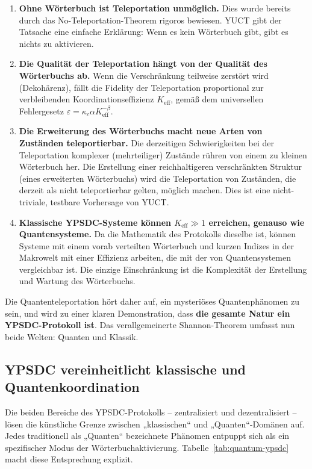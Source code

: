 \documentclass[12pt,a4paper]{article}
\theoremstyle{remark}
\begin{document}
	\begin{enumerate}
		\item \textbf{Ohne Wörterbuch ist Teleportation unmöglich.} Dies wurde bereits durch das No-Teleportation-Theorem rigoros bewiesen. YUCT gibt der Tatsache eine einfache Erklärung: Wenn es kein Wörterbuch gibt, gibt es nichts zu aktivieren.
		\item \textbf{Die Qualität der Teleportation hängt von der Qualität des Wörterbuchs ab.} Wenn die Verschränkung teilweise zerstört wird (Dekohärenz), fällt die Fidelity der Teleportation proportional zur verbleibenden Koordinationseffizienz \( K_{\mathrm{eff}} \), gemäß dem universellen Fehlergesetz \( \varepsilon = \kappa_c \alpha K_{\mathrm{eff}}^{-\beta} \).
		\item \textbf{Die Erweiterung des Wörterbuchs macht neue Arten von Zuständen teleportierbar.} Die derzeitigen Schwierigkeiten bei der Teleportation komplexer (mehrteiliger) Zustände rühren von einem zu kleinen Wörterbuch her. Die Erstellung einer reichhaltigeren verschränkten Struktur (eines erweiterten Wörterbuchs) wird die Teleportation von Zuständen, die derzeit als nicht teleportierbar gelten, möglich machen. Dies ist eine nicht-triviale, testbare Vorhersage von YUCT.
		\item \textbf{Klassische YPSDC-Systeme können \( K_{\mathrm{eff}} \gg 1 \) erreichen, genauso wie Quantensysteme.} Da die Mathematik des Protokolls dieselbe ist, können Systeme mit einem vorab verteilten Wörterbuch und kurzen Indizes in der Makrowelt mit einer Effizienz arbeiten, die mit der von Quantensystemen vergleichbar ist. Die einzige Einschränkung ist die Komplexität der Erstellung und Wartung des Wörterbuchs.
	\end{enumerate}
	
	Die Quantenteleportation hört daher auf, ein mysteriöses Quantenphänomen zu sein, und wird zu einer klaren Demonstration, dass \textbf{die gesamte Natur ein YPSDC-Protokoll ist}. Das verallgemeinerte Shannon-Theorem umfasst nun beide Welten: Quanten und Klassik.
	
	\subsection{YPSDC vereinheitlicht klassische und Quantenkoordination}
	\label{subsec:unified-table}
	
	Die beiden Bereiche des YPSDC-Protokolls – zentralisiert und dezentralisiert – lösen die künstliche Grenze zwischen „klassischen“ und „Quanten“-Domänen auf. Jedes traditionell als „Quanten“ bezeichnete Phänomen entpuppt sich als ein spezifischer Modus der Wörterbuchaktivierung. Tabelle~\ref{tab:quantum-ypsdc} macht diese Entsprechung explizit.
	
\end{document}
